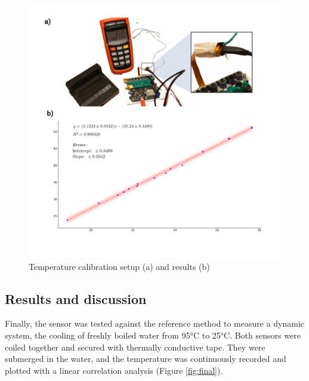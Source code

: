 \documentclass[conference]{IEEEtran}
\begin{document}
      \begin{figure}[h]
         \centering
         \includegraphics[width=1\linewidth]{images/temp calibration.png}
         \caption{Temperature calibration setup (a) and results (b)}
         \label{fig:temp}
      \end{figure}


      \subsection{Results and discussion}

   Finally, the sensor was tested against the reference method to measure a dynamic system, the cooling of freshly boiled water from 95°C to 25°C. Both sensors were coiled together and secured with thermally conductive tape. 
   They were submerged in the water, and the temperature was continuously recorded and plotted with a linear correlation analysis (Figure \ref{fig:final}).
\end{document}
